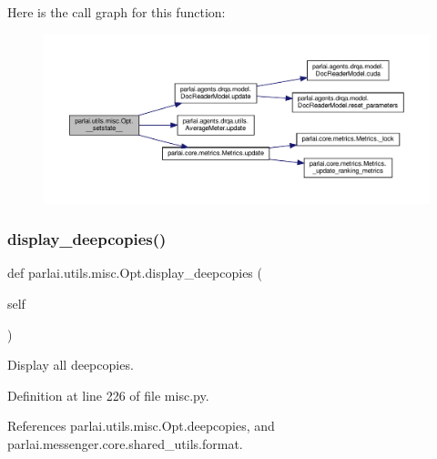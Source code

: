 Here is the call graph for this function\+:
\nopagebreak
\begin{figure}[H]
\begin{center}
\leavevmode
\includegraphics[width=350pt]{classparlai_1_1utils_1_1misc_1_1Opt_ab9abc2aba6c09db1d6e65744dacb6090_cgraph}
\end{center}
\end{figure}
\mbox{\label{classparlai_1_1utils_1_1misc_1_1Opt_aef6b123f77613b7e3ecc45716de89ee2}} 
\subsubsection{\texorpdfstring{display\+\_\+deepcopies()}{display\_deepcopies()}}
{\footnotesize\ttfamily def parlai.\+utils.\+misc.\+Opt.\+display\+\_\+deepcopies (\begin{DoxyParamCaption}\item[{}]{self }\end{DoxyParamCaption})}

\begin{DoxyVerb}Display all deepcopies.\end{DoxyVerb}
 

Definition at line 226 of file misc.\+py.



References parlai.\+utils.\+misc.\+Opt.\+deepcopies, and parlai.\+messenger.\+core.\+shared\+\_\+utils.\+format.

\mbox{\label{classparlai_1_1utils_1_1misc_1_1Opt_aee1d325bb2691ce4c007075d6f8abffc}} 

